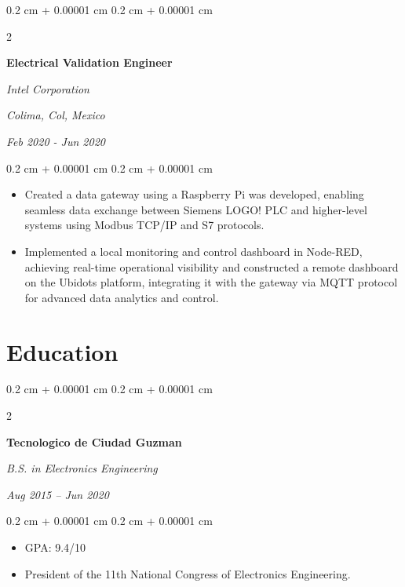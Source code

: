 \documentclass[10pt, letterpaper]{article}
\newenvironment{highlights}{
    \begin{itemize}[
        topsep=0.10 cm,
        parsep=0.10 cm,
        partopsep=0pt,
        itemsep=0pt,
        leftmargin=0.4 cm + 10pt
    ]
}{
    \end{itemize}
} %
\newenvironment{onecolentry}{
    \begin{adjustwidth}{
        0.2 cm + 0.00001 cm
    }{
        0.2 cm + 0.00001 cm
    }
}{
    \end{adjustwidth}
} %
\newenvironment{twocolentry}[2][]{
    \onecolentry
    \def\secondColumn{#2}
    \setcolumnwidth{\fill, 4.5 cm}
    \begin{paracol}{2}
}{
    \switchcolumn \raggedleft \secondColumn
    \end{paracol}
    \endonecolentry
} %
\begin{document}
        \vspace{0.2 cm}

        \begin{twocolentry}{
        \textit{Colima, Col, Mexico}    
            
        \textit{Feb 2020 - Jun 2020}}
            \textbf{Electrical Validation Engineer}
            
            \textit{Intel Corporation}
        \end{twocolentry}

        \vspace{0.10 cm}
        \begin{onecolentry}
            \begin{highlights}
                \item Created a data gateway using a Raspberry Pi was developed, enabling seamless data exchange between Siemens LOGO! PLC and higher-level systems using Modbus TCP/IP and S7 protocols.
                \item Implemented a local monitoring and control dashboard in Node-RED, achieving real-time operational visibility and constructed a remote dashboard on the Ubidots platform, integrating it with the gateway via MQTT protocol for advanced data analytics and control.
            \end{highlights}
        \end{onecolentry}

    
    \section{Education}



        
        \begin{twocolentry}{
            
        \textit{Aug 2015 – Jun 2020}}
            \textbf{Tecnologico de Ciudad Guzman}

            \textit{B.S. in Electronics Engineering}
        \end{twocolentry}

        \vspace{0.10 cm}
        \begin{onecolentry}
            \begin{highlights}
                \item GPA: 9.4/10 
                \item President of the 11th National Congress of Electronics Engineering.
            \end{highlights}
        \end{onecolentry}
\end{document}
